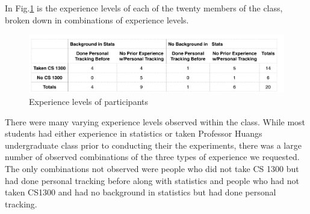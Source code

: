 In Fig.\ref{fig:table} is the experience levels of each of the twenty members of the class, broken down in combinations of experience levels. 

\begin{figure}[!t]\centering
\includegraphics[width=1.0\columnwidth]{images/Backgrounds_of_Students.PNG}
\caption{\footnotesize Experience levels of participants \label{fig:table} 
}%
\end{figure}

There were many varying experience levels observed within the class.  While most students had either experience in statistics or taken Professor Huang\textquotesingle s undergraduate class prior to conducting their the experiments, there was a large number of observed combinations of the three types of experience we requested. The only combinations not observed were people who did not take CS 1300 but had done personal tracking before along with statistics and people who had not taken CS1300 and had no background in statistics but had done personal tracking.
